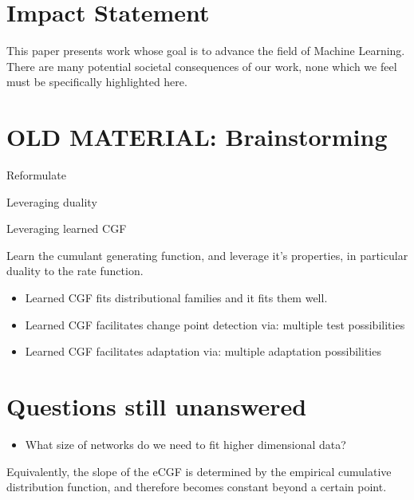 \documentclass{article}      %
\begin{document}
\section*{Impact Statement}
This paper presents work whose goal is to advance the field of 
Machine Learning. There are many potential societal consequences 
of our work, none which we feel must be specifically highlighted here.


\section{OLD MATERIAL: Brainstorming}

Reformulate

Leveraging duality 

Leveraging learned CGF

Learn the cumulant generating function, and leverage it's properties, in particular duality to the rate function.

\begin{itemize}
  \item Learned CGF fits distributional families and it fits them well.
  \item Learned CGF facilitates change point detection via: multiple test possibilities
  \item Learned CGF facilitates adaptation via: multiple adaptation possibilities
\end{itemize}

\section{Questions still unanswered}
\begin{itemize}
  \item What size of networks do we need to fit higher dimensional data?
\end{itemize}


Equivalently, the slope of the eCGF is determined by the empirical cumulative distribution function, and therefore becomes constant beyond a certain point.



\end{document}
